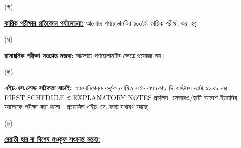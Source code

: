 \documentclass[12pt]{article}
\begin{document}
\begin{minipage}[t]{0.05\linewidth}
\hspace{1em}
\end{minipage}
\begin{minipage}[t]{0.05\linewidth}
(গ)
\end{minipage}
\begin{minipage}[t]{0.90\linewidth}
\underline{\textbf{কায়িক পরীক্ষার প্রতিবেদন পর্যালোচনা:}}
আলোচ্য পণ্যচালানটির ১০০\% কায়িক পরীক্ষা করা হয়।
\\
\end{minipage}
\begin{minipage}[t]{0.05\linewidth}
\hspace{1em}
\end{minipage}
\begin{minipage}[t]{0.05\linewidth}
(ঘ)
\end{minipage}
\begin{minipage}[t]{0.90\linewidth}
\underline{\textbf{রাসায়নিক পরীক্ষা সংক্রান্ত মন্তব্য:}}
আলোচ্য পণ্যচালানটির ক্ষেত্রে প্রযোজ্য নয়।
\\
\end{minipage}
\begin{minipage}[t]{0.05\linewidth}
\hspace{1em}
\end{minipage}
\begin{minipage}[t]{0.05\linewidth}
(ঙ)
\end{minipage}
\begin{minipage}[t]{0.90\linewidth}
\underline{\textbf{এইচ.এস.কোড সঠিকতা যাচাই:}}
আমদানিকারক কর্তৃক ঘোষিত এইচ.এস.কোড দি কাস্টমস্ এ্যাক্ট ১৯৬৯ এর FIRST SCHEDULE ও
EXPLANATORY NOTES প্রচলিত এসআরও/স্থায়ী আদেশ ইত্যাদির আলোকে পরীক্ষা করা হলো।
প্রত্যায়িত এইচ.এস.কোড যথাযথ আছে।
\\
\end{minipage}
\begin{minipage}[t]{0.05\linewidth}
\hspace{1em}
\end{minipage}
\begin{minipage}[t]{0.05\linewidth}
(চ)
\end{minipage}
\begin{minipage}[t]{0.90\linewidth}
\underline{\textbf{রেয়াতী হার বা বিশেষ মওকুফ সংক্রান্ত মন্তব্য:}}
\end{minipage}
\begin{minipage}[t]{0.1\linewidth}
\hspace{1em}
\end{minipage}
\end{document}
